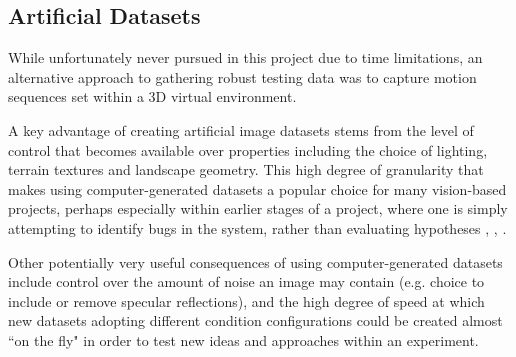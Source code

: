 %
%
%
%
%
%


\subsection{Artificial Datasets}

While unfortunately never pursued in this project due to time limitations, an alternative approach to gathering robust testing data was to capture motion sequences set within a 3D virtual environment. 

A key advantage of creating artificial image datasets stems from the level of control that becomes available over properties including the choice of lighting, terrain textures and landscape geometry. This high degree of granularity that makes using computer-generated datasets a popular choice for many vision-based projects, perhaps especially within earlier stages of a project, where one is simply attempting to identify bugs in the system, rather than evaluating hypotheses \cite{ucl-dataset}, \cite{baker-dataset}, \cite{mpi-dataset}.
 
Other potentially very useful consequences of using computer-generated datasets include control over the amount of noise an image may contain (e.g. choice to include or remove specular reflections), and the high degree of speed at which new datasets adopting different condition configurations could be created almost ``on the fly" in order to test new ideas and approaches within an experiment. 


